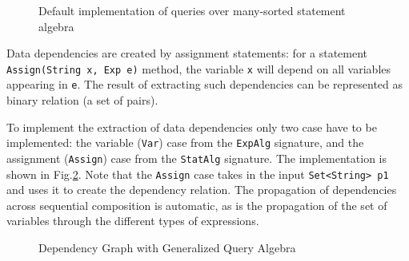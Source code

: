 \begin{figure}[t]
\vspace{-.1in}
\caption{Default implementation of queries over many-sorted statement algebra}
\label{LST:gstatquery}
\end{figure}


Data dependencies are created by assignment statements:
for a statement \lstinline{Assign(String x, Exp e)} method, the variable \lstinline{x} will depend on all variables appearing in \lstinline{e}.
The result of extracting such dependencies can be represented as binary relation (a set of pairs). 

To implement the extraction of data dependencies only two case have to be implemented: the variable (\lstinline{Var}) case from the \lstinline{ExpAlg} signature, and the assignment (\lstinline{Assign}) case from the \lstinline{StatAlg} signature.
The implementation is shown in Fig.\ref{deps2}.
Note that the \lstinline{Assign} case takes in the input \lstinline{Set<String> p1} and uses it to create the  dependency relation.
The propagation of dependencies across sequential composition is automatic, as is the propagation of the set of variables through the different types of expressions.


\begin{figure}[tb]
\vspace{-.1in}
\caption{Dependency Graph with Generalized Query Algebra}
\label{deps2}
\end{figure}

